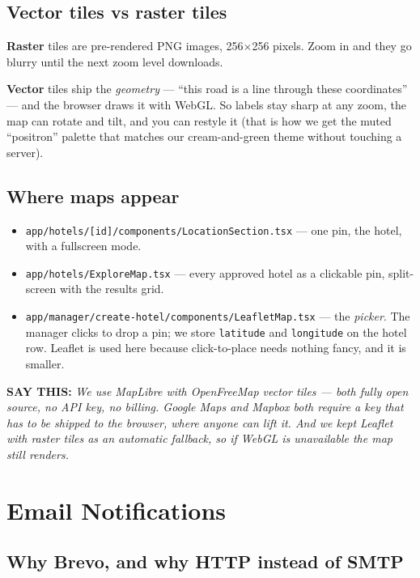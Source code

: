 \documentclass[11pt,a4paper]{article}
\newcommand{\saythis}[1]{\begin{saybox}\textbf{\small\color{primary}SAY THIS:} \textit{#1}\end{saybox}}
\newcommand{\file}[1]{\texttt{\small #1}}
\begin{document}
\subsection{Vector tiles vs raster tiles}

\textbf{Raster} tiles are pre-rendered PNG images, 256$\times$256 pixels. Zoom in
and they go blurry until the next zoom level downloads.

\textbf{Vector} tiles ship the \emph{geometry} --- ``this road is a line through
these coordinates'' --- and the browser draws it with WebGL. So labels stay sharp
at any zoom, the map can rotate and tilt, and you can restyle it (that is how we
get the muted ``positron'' palette that matches our cream-and-green theme without
touching a server).

\subsection{Where maps appear}

\begin{itemize}[leftmargin=*,noitemsep]
  \item \file{app/hotels/[id]/components/LocationSection.tsx} --- one pin, the
        hotel, with a fullscreen mode.
  \item \file{app/hotels/ExploreMap.tsx} --- every approved hotel as a clickable
        pin, split-screen with the results grid.
  \item \file{app/manager/create-hotel/components/LeafletMap.tsx} --- the
        \emph{picker}. The manager clicks to drop a pin; we store
        \texttt{latitude} and \texttt{longitude} on the hotel row. Leaflet is used
        here because click-to-place needs nothing fancy, and it is smaller.
\end{itemize}

\saythis{We use MapLibre with OpenFreeMap vector tiles --- both fully open source,
no API key, no billing. Google Maps and Mapbox both require a key that has to be
shipped to the browser, where anyone can lift it. And we kept Leaflet with raster
tiles as an automatic fallback, so if WebGL is unavailable the map still renders.}

\newpage
\section{Email Notifications}

\subsection{Why Brevo, and why HTTP instead of SMTP}
\end{document}
